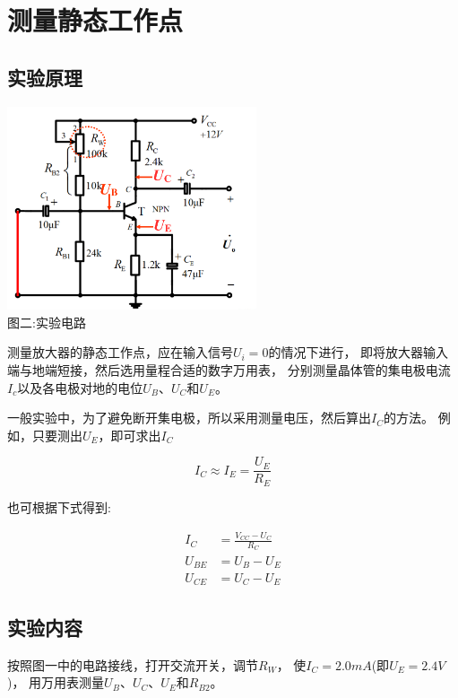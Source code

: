 \documentclass[a4paper]{article}
\begin{document}
    \section{测量静态工作点}\label{sec:3}

    \subsection{实验原理}\label{subsec:2}
    \begin{center}
        \includegraphics[height=170pt]{exp2}\\
        {\small 图二:实验电路}
    \end{center}

    {{测量放大器的静态工作点，应在输入信号$U_i=0$的情况下进行，
    即将放大器输入端与地端短接，然后选用量程合适的数字万用表，
    分别测量晶体管的集电极电流$I_c$以及各电极对地的电位$U_B$、$U_C$和$U_E$。}}

    {{一般实验中，为了避免断开集电极，所以采用测量电压，然后算出$I_C$的方法。
    例如，只要测出$U_E$，即可求出$I_C$}}

    \begin{equation}
        I_C\approx I_E=\frac{U_E}{R_E}\label{eq:equation}
    \end{equation}

    {{也可根据下式得到:}}

    \begin{equation}
        \begin{aligned}
            I_C&=\frac{V_{CC}-U_C}{R_C}\\
            U_{BE}&=U_B-U_E\\
            U_{CE}&=U_C-U_E\label{eq:equation2}
        \end{aligned}
    \end{equation}

    \subsection{实验内容}\label{subsec:}
    {{按照图一中的电路接线，打开交流开关，调节$R_W$，
    使$I_C=2.0mA$(即$U_E=2.4V$)，
    用万用表测量$U_B$、$U_C$、$U_E$和$R_{B2}$。}}
\end{document}
